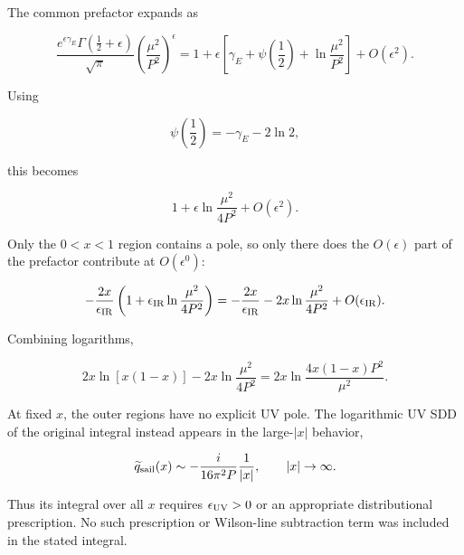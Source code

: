 The common prefactor expands as

\[
\frac{e^{\epsilon\gamma_E}\Gamma(\frac12+\epsilon)} {\sqrt{\pi}} \left(\frac{\mu^2}{P^2}\right)^\epsilon = 1+\epsilon \left[ \gamma_E+\psi\left(\frac12\right) +\ln\frac{\mu^2}{P^2} \right]+O(\epsilon^2).
\]

Using

\[
\psi\left(\frac12\right)=-\gamma_E-2\ln2,
\]

this becomes

\[
1+\epsilon\ln\frac{\mu^2}{4P^2}+O(\epsilon^2).
\]

Only the $0<x<1$ region contains a pole, so only there does the $O(\epsilon)$ part of the prefactor contribute at $O(\epsilon^0)$:

\[
-\frac{2x}{\epsilon_{\rm IR}} \left(1+\epsilon_{\rm IR}\ln\frac{\mu^2}{4P^2}\right) = -\frac{2x}{\epsilon_{\rm IR}} -2x\ln\frac{\mu^2}{4P^2} +O(\epsilon_{\rm IR}).
\]

Combining logarithms,

\[
2x\ln[x(1-x)] -2x\ln\frac{\mu^2}{4P^2} = 2x\ln\frac{4x(1-x)P^2}{\mu^2}.
\]

At fixed $x$, the outer regions have no explicit UV pole. The logarithmic UV SDD of the original integral instead appears in the large-$|x|$ behavior,

\[
\widetilde q_{\rm sail}(x)\sim-\frac{i}{16\pi^2P}\frac1{|x|}, \qquad |x|\to\infty.
\]

Thus its integral over all $x$ requires $\epsilon_{\rm UV}>0$ or an appropriate distributional prescription. No such prescription or Wilson-line subtraction term was included in the stated integral.
